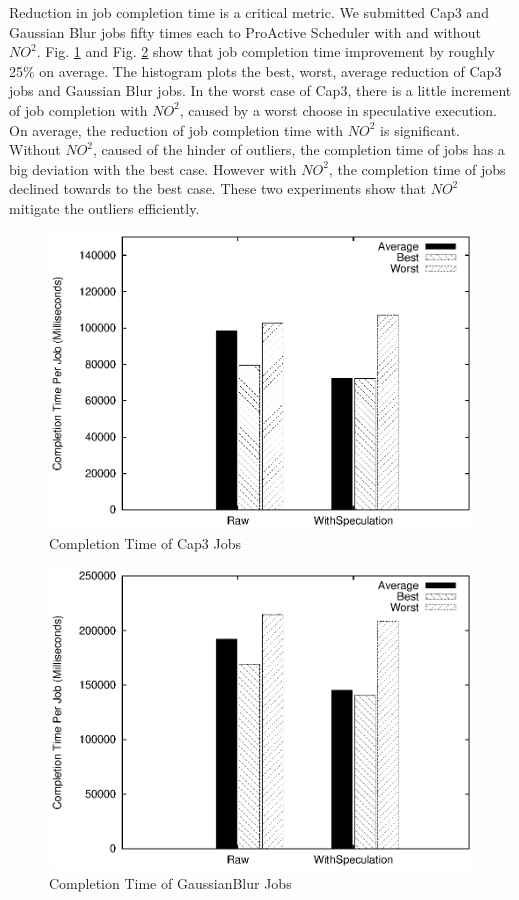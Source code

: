 Reduction in job completion time is a critical metric. We submitted Cap3 and Gaussian Blur jobs fifty times each to ProActive Scheduler with and without $NO^2$. Fig. \ref{figure:completiontime_cap3} and Fig. \ref{figure:completiontime_gaussianblur} show that job completion time improvement by roughly 25\% on average. The histogram plots the best, worst, average reduction of Cap3 jobs and Gaussian Blur jobs. In the worst case of Cap3, there is a little increment of job completion with $NO^2$, caused by a worst choose in speculative execution. On average, the reduction of job completion time with $NO^2$ is significant. Without $NO^2$, caused of the hinder of outliers, the completion time of jobs has a big deviation with the best case. However with $NO^2$, the completion time of jobs declined towards to the best case. These two experiments show that $NO^2$ mitigate the outliers efficiently.

\begin{figure}
\centering
\includegraphics[width=0.9\columnwidth]{figures/completiontime_cap3.eps}
\caption{Completion Time of Cap3 Jobs}
\label{figure:completiontime_cap3}
\end{figure}

\begin{figure}
\centering
\includegraphics[width=0.9\columnwidth]{figures/completiontime_gaussianblur.eps}
\caption{Completion Time of GaussianBlur Jobs}
\label{figure:completiontime_gaussianblur}
\end{figure}

